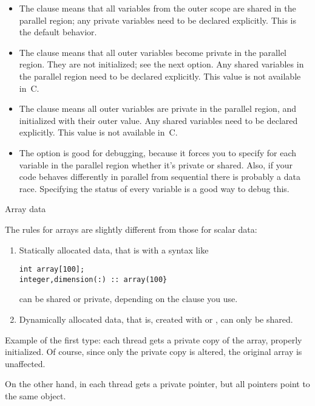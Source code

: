 \begin{itemize}
\item The  clause means that all
  variables from the outer scope are shared in the parallel region; any private variables
  need to be declared explicitly. This is the default behavior.
\item The  clause means that all
  outer variables become private in the parallel region. They are not
  initialized; see the next option. Any shared variables in the
  parallel region
  need to be declared explicitly. This value is not available in~C.
\item The  clause means all
  outer variables are private in the parallel region, and initialized
  with their outer value.  Any shared variables
  need to be declared explicitly. This value is not available in~C.
\item The  option is good for debugging, 
  because it forces you to specify for each variable in the parallel region
  whether it's private or shared. Also,
  if your code
behaves differently in parallel from sequential there is probably a data race.
Specifying the status of every variable is a good way to
debug this.
\end{itemize}

 {Array data}
\label{sec:omp-array}

The rules for arrays are slightly different from those for scalar data:
\begin{enumerate}
\item Statically allocated data, that is with a syntax like
\begin{lstlisting}
int array[100];
integer,dimension(:) :: array(100}
\end{lstlisting}
can be shared or private, depending on the clause you use.
\item Dynamically allocated data, that is, created with
   or
  , can only be shared.
\end{enumerate}
Example of the first type:
each thread gets a private copy of the array, properly initialized.
%
%
Of course, since only the private copy is altered, the original array
is unaffected.

On the other hand, in
%
%
each thread gets a private pointer, but all pointers point to the same
object.


